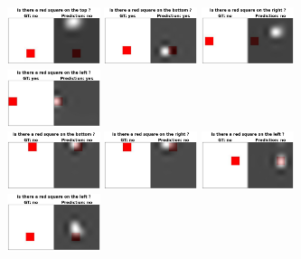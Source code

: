 \begin{figure}[!t]
  \includegraphics[width=0.242\textwidth]{figures/rule1_im_30075_219_top.JPEG}
  \includegraphics[width=0.242\textwidth]{figures/rule1_im_31186_4441_bottom.JPEG}
  \includegraphics[width=0.242\textwidth]{figures/rule1_im_31189_690_right.JPEG}
  \includegraphics[width=0.242\textwidth]{figures/rule1_im_31200_4217_left.JPEG}\\
  \includegraphics[width=0.242\textwidth]{figures/rule2_im_30004_3495_bottom.JPEG}
  \includegraphics[width=0.242\textwidth]{figures/rule2_im_30036_3165_right.JPEG}
  \includegraphics[width=0.242\textwidth]{figures/rule2_im_31185_2199_left.JPEG}
  \includegraphics[width=0.242\textwidth]{figures/rule2_im_31186_1310_left.JPEG}

\end{figure}
